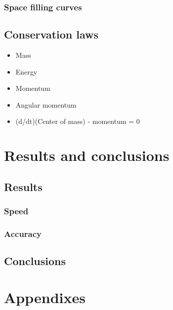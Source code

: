 \documentclass[a4paper]{report}
\begin{document}
\section{Space filling curves}

\chapter{Conservation laws}

\begin{itemize}
    \item Mass
    \item Energy
    \item Momentum
    \item Angular momentum
    \item (d/dt)(Center of mass) - momentum = 0
\end{itemize}


\part{Results and conclusions}

\chapter{Results}

\section{Speed}

\section{Accuracy}

\chapter{Conclusions}


\part{Appendixes}

\appendix
\end{document}
